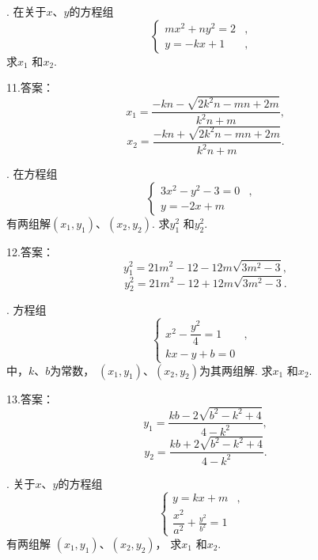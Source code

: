 \documentclass[UTF8]{ctexart}
\begin{document}
. 在关于$x$、$y$的方程组\begin{equation*}
    \left\{
    \begin{aligned}
     mx^2+ny^2=2&,& \\
     y=-kx+1&,&
    \end{aligned}
    \right.
    \end{equation*}求$x_1$ 和$x_2$.\vspace{3cm}
    
\noindent 11.答案： $$x_1=\dfrac{-kn-\sqrt{2k^2n-mn+2m}}{k^2n+m},$$
     $$x_2=\dfrac{-kn+\sqrt{2k^2n-mn+2m}}{k^2n+m}.$$
      \newpage
    
. 在方程组\begin{equation*}
    \left\{
    \begin{aligned}
     3x^2-y^2-3=0&,& \\
     y=-2x+m& &
    \end{aligned}
    \right.
    \end{equation*}有两组解$(x_1,y_1)$、$(x_2,y_2)$. 求$y_1^2$ 和$y_2^2$.\vspace{3cm}
    
\noindent 12.答案：$$y_1^2=21m^2-12-12m\sqrt{3m^2-3},$$
     $$y_2^2=21m^2-12+12m\sqrt{3m^2-3}.$$
      \newpage
    
. 方程组\begin{equation*}
    \left\{
    \begin{aligned}
     x^2-\dfrac{y^2}{4}=1&,& \\
     kx-y+b=0 & &
    \end{aligned}
    \right.
    \end{equation*}中，$k$、$b$为常数， $(x_1,y_1)$、$(x_2,y_2)$为其两组解. 求$x_1$ 和$x_2$.\vspace{3cm}
    
\noindent 13.答案：$$y_1=\dfrac{kb-2\sqrt{b^2-k^2+4}}{4-k^2},$$
     $$y_2=\dfrac{kb+2\sqrt{b^2-k^2+4}}{4-k^2}.$$
      \newpage
    
. 关于$x$、$y$的方程组\begin{equation*}
    \left\{
    \begin{aligned}
     y=kx+m&,& \\
     \dfrac{x^2}{a^2}+\frac{y^2}{b^2}=1 & &
    \end{aligned}
    \right.
    \end{equation*}{\color{red}有两组解 $(x_1,y_1)$、$(x_2,y_2)$，} 求$x_1$ 和$x_2$.\vspace{3cm}
    
\end{document}
